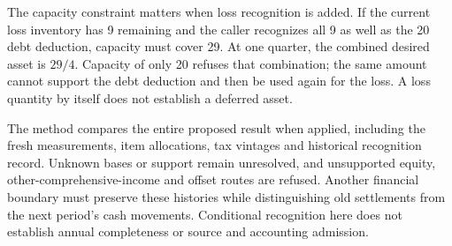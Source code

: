 The capacity constraint matters when loss recognition is added. If the current
loss inventory has 9 remaining and the caller recognizes all 9 as well as the
20 debt deduction, capacity must cover 29. At one quarter, the combined desired
asset is $29/4$. Capacity of only 20 refuses that combination; the same amount
cannot support the debt deduction and then be used again for the loss. A loss
quantity by itself does not establish a deferred asset.

The method compares the entire proposed result when applied, including the
fresh measurements, item allocations, tax vintages and historical recognition
record. Unknown bases or support remain unresolved, and unsupported equity,
other-comprehensive-income and offset routes are refused. Another financial
boundary must preserve these histories while distinguishing old settlements
from the next period's cash movements. Conditional recognition here does not
establish annual completeness or source and accounting admission.
